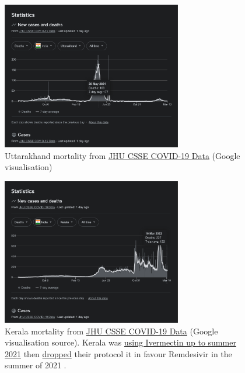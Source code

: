 \documentclass[11pt,a4paper,notitlepage]{report}
\begin{document}
\begin{figure}[h]
    \centering
    \includegraphics[width=0.7\textwidth]{india-uttarakhand-mortality}
    \caption{Uttarakhand mortality from \href{https://github.com/CSSEGISandData/COVID-19}{JHU CSSE COVID-19 Data} (Google visualisation)}
    \label{fig:india-uttarakhand-mortality}
\end{figure}

\begin{figure}[h]
    \centering
    \includegraphics[width=0.7\textwidth]{india-kerala-mortality}
    \caption{Kerala mortality from \href{https://github.com/CSSEGISandData/COVID-19}{JHU CSSE COVID-19 Data} (Google visualisation source). Kerala was \href{https://dhs.kerala.gov.in/wp-content/uploads/2021/04/Kerala-State-COVID-19-guidelines-Version-3.pdf}{using Ivermectin up to summer 2021} then \href{https://www.thehindu.com/news/national/kerala/kerala-revises-covid-19-treatment-guidelines/article35775373.ece}{dropped} their protocol it in favour Remdesivir in the summer of 2021 \cite{hindu06082021}.}
    \label{fig:india-kerala-mortality}
\end{figure}
\end{document}
